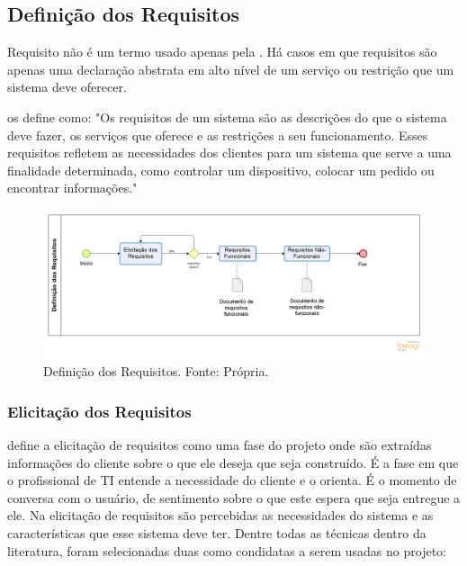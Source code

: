 \subsection{Definição dos Requisitos}

Requisito não é um termo usado apenas pela \imprimircurso. Há casos em que requisitos são apenas uma declaração abstrata em alto nível de um serviço ou restrição que um sistema deve oferecer.

\cite{sommerville} os define como: "Os requisitos de um sistema são as descrições do que o sistema deve fazer, os serviços que oferece e as restrições a seu funcionamento. Esses requisitos refletem as necessidades dos clientes para um sistema que serve a uma finalidade determinada, como controlar um dispositivo, colocar um pedido ou encontrar informações."

\begin{figure}[H]
	\centering
	\includegraphics[width=1.0\textwidth]{figuras/elicitacaoDosRequisitos.png}
	\caption{Definição dos Requisitos. Fonte: Própria.}
	\label{img:definicao_requisitos}
\end{figure}

\subsubsection{Elicitação dos Requisitos}
\label{sec:elicitacao_requisitos}

\cite{sommerville} define a elicitação de requisitos como uma fase do projeto onde são extraídas informações do cliente sobre o que ele deseja que seja construído. É a fase em que o profissional de TI entende a necessidade do cliente e o orienta. É o momento de conversa com o usuário, de sentimento sobre o que este espera que seja entregue a ele. Na elicitação de requisitos são percebidas as necessidades do sistema e as características que esse sistema deve ter. Dentre todas as técnicas dentro da literatura, foram selecionadas duas como condidatas a serem usadas no projeto:

